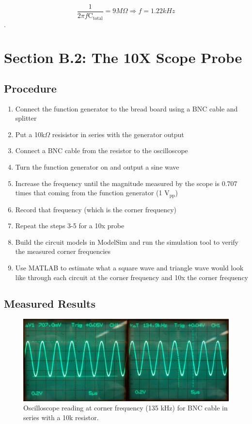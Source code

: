 \documentclass[12pt,letterpaper]{report}
\begin{document}
$$ \frac{1}{2 \pi f\text{C}_{\text{total}}} = 9 M\Omega \Rightarrow f = 1.22 kHz $$.

\section*{Section B.2: The 10X Scope Probe}
\subsection*{Procedure}
\begin{enumerate}
	\item Connect the function generator to the bread board using a BNC cable and splitter
	\item Put a 10k$\Omega$ resisistor in series with the generator output
	\item Connect a BNC cable from the resistor to the oscilloscope
	\item Turn the function generator on and output a sine wave
	\item Increase the frequency until the magnitude measured by the scope is 0.707 times that coming from the function generator (1 $\text{V}_{\text{pp}}$)
	\item Record that frequency (which is the corner frequency)
	\item Repeat the steps 3-5 for a 10x probe
	\item Build the circuit models in ModelSim and run the simulation tool to verify the measured corner frequencies
	\item Use MATLAB to estimate what a square wave and triangle wave would look like through each circuit at the corner frequency and 10x the corner frequency
\end{enumerate}

\subsection*{Measured Results}

\begin{figure}
	\centering
	\includegraphics[width=\linewidth, keepaspectratio=true]{lab1_images/BNC_sine_corner.png} 
	\caption{Oscilloscope reading at corner frequency (135 kHz) for BNC cable in series with a 10k resistor. }
	\label{fig:bnc_corner}
\end{figure}
\end{document}
